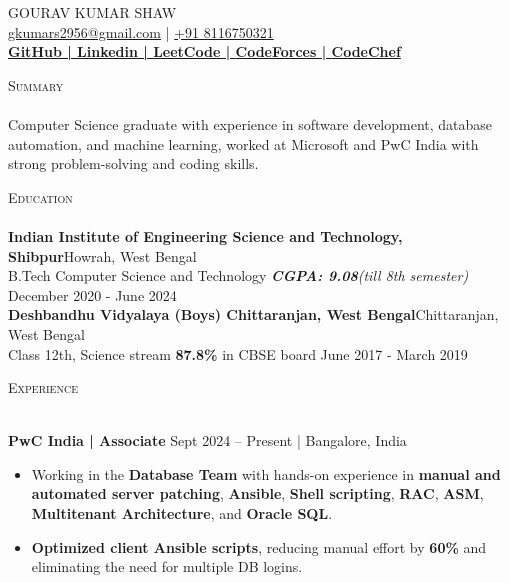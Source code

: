 \documentclass[a4paper]{article}
\newcommand{\lineunder} {
    \vspace*{-8pt} \\
    \hspace*{-18pt} \hrulefill \\
}
\newcommand{\header} [1] {
    {\hspace*{-18pt}\vspace*{6pt} \textsc{#1}}
    \vspace*{-6pt} \lineunder
}
\begin{document}
\vspace*{-46pt}

\begin{center}
    {\Huge \scshape {GOURAV KUMAR SHAW}}\\
    \vspace*{2pt}
    \href{mailto:gkumars2956@gmail.com}{gkumars2956@gmail.com} | \href{tel:+91 8116750321}{+91 8116750321}\\
    \vspace*{2pt}
    \textbf{\href{https://github.com/Gourav1695}{GitHub | }}\textbf{\href{https://www.linkedin.com/in/gourav-kumar-shaw-b25561226/}{Linkedin | }}\textbf{\href{https://leetcode.com/gouravkr85/}{LeetCode | }}\textbf{\href{https://codeforces.com/profile/Gouravkr85}{CodeForces | }}\textbf{\href{https://www.codechef.com/users/gouravkr85}{CodeChef}}\\
\end{center}

\header{Summary}
Computer Science graduate with experience in software development, database automation, and machine learning, worked at Microsoft and PwC India with strong problem-solving and coding skills.

\header{Education}
\vspace{2mm}
\textbf{Indian Institute of Engineering Science and Technology, Shibpur}\hfill Howrah, West Bengal\\
B.Tech Computer Science and Technology \textit{\textbf{CGPA: 9.08}(till 8th semester)} \hfill December 2020 - June 2024\\
\vspace{2mm}
\textbf{Deshbandhu Vidyalaya (Boys) Chittaranjan, West Bengal}\hfill Chittaranjan, West Bengal\\
Class 12th, Science stream \textbf{87.8\%} in CBSE board \hfill June 2017 - March 2019\\
\vspace{2mm}

\header{Experience}
\vspace{2mm}

\textbf{PwC India | Associate}  \hfill Sept 2024 – Present | Bangalore, India\\
\vspace{-1mm}
\begin{itemize} \itemsep -2pt
    \item Working in the \textbf{Database Team} with hands-on experience in \textbf{manual and automated server patching}, \textbf{Ansible}, \textbf{Shell scripting}, \textbf{RAC}, \textbf{ASM}, \textbf{Multitenant Architecture}, and \textbf{Oracle SQL}.
    \item \textbf{Optimized client Ansible scripts}, reducing manual effort by \textbf{60\%} and eliminating the need for multiple DB logins.
\end{itemize}
\end{document}
